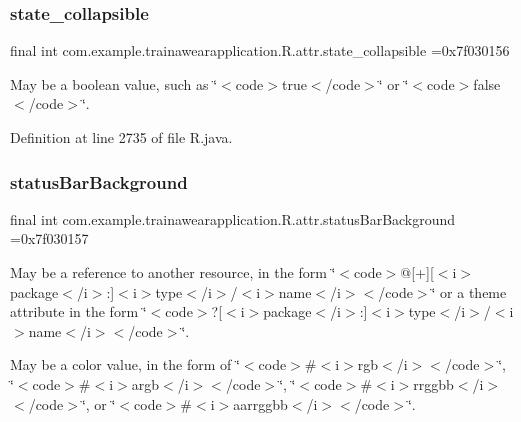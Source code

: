 \mbox{\label{classcom_1_1example_1_1trainawearapplication_1_1_r_1_1attr_a3818c6d581680ca8f30348c0c7640da4}} 
\subsubsection{\texorpdfstring{state\_collapsible}{state\_collapsible}}
{\footnotesize\ttfamily final int com.\+example.\+trainawearapplication.\+R.\+attr.\+state\+\_\+collapsible =0x7f030156\hspace{0.3cm}{\ttfamily [static]}}

May be a boolean value, such as \char`\"{}$<$code$>$true$<$/code$>$\char`\"{} or \char`\"{}$<$code$>$false$<$/code$>$\char`\"{}. 

Definition at line 2735 of file R.\+java.

\mbox{\label{classcom_1_1example_1_1trainawearapplication_1_1_r_1_1attr_a6dbc278ab5b00fe7fe4a0a17c0253026}} 
\subsubsection{\texorpdfstring{statusBarBackground}{statusBarBackground}}
{\footnotesize\ttfamily final int com.\+example.\+trainawearapplication.\+R.\+attr.\+status\+Bar\+Background =0x7f030157\hspace{0.3cm}{\ttfamily [static]}}

May be a reference to another resource, in the form \char`\"{}$<$code$>$@\mbox{[}+\mbox{]}\mbox{[}$<$i$>$package$<$/i$>$\+:\mbox{]}$<$i$>$type$<$/i$>$/$<$i$>$name$<$/i$>$$<$/code$>$\char`\"{} or a theme attribute in the form \char`\"{}$<$code$>$?\mbox{[}$<$i$>$package$<$/i$>$\+:\mbox{]}$<$i$>$type$<$/i$>$/$<$i$>$name$<$/i$>$$<$/code$>$\char`\"{}. 

May be a color value, in the form of \char`\"{}$<$code$>$\#$<$i$>$rgb$<$/i$>$$<$/code$>$\char`\"{}, \char`\"{}$<$code$>$\#$<$i$>$argb$<$/i$>$$<$/code$>$\char`\"{}, \char`\"{}$<$code$>$\#$<$i$>$rrggbb$<$/i$>$$<$/code$>$\char`\"{}, or \char`\"{}$<$code$>$\#$<$i$>$aarrggbb$<$/i$>$$<$/code$>$\char`\"{}. 

